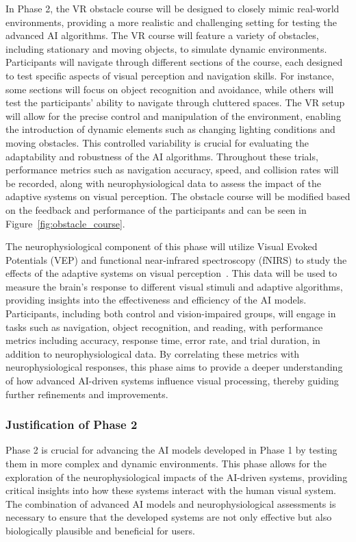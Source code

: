 \documentclass[10pt]{article}
\begin{document}
In Phase 2, the VR obstacle course will be designed to closely mimic real-world
environments, providing a more realistic and challenging setting for testing the
advanced AI algorithms. The VR course will feature a variety of obstacles,
including stationary and moving objects, to simulate dynamic environments.
Participants will navigate through different sections of the course, each
designed to test specific aspects of visual perception and navigation skills.
For instance, some sections will focus on object recognition and avoidance,
while others will test the participants' ability to navigate through cluttered
spaces. The VR setup will allow for the precise control and manipulation of the
environment, enabling the introduction of dynamic elements such as changing
lighting conditions and moving obstacles. This controlled variability is crucial
for evaluating the adaptability and robustness of the AI algorithms. Throughout
these trials, performance metrics such as navigation accuracy, speed, and
collision rates will be recorded, along with neurophysiological data to assess
the impact of the adaptive systems on visual perception. The obstacle course
will be modified based on the feedback and performance of the participants and
can be seen in Figure~\ref{fig:obstacle_course}.

The neurophysiological component of this phase will utilize Visual Evoked
Potentials (VEP) and functional near-infrared spectroscopy (fNIRS) to study the
effects of the adaptive systems on visual
perception~\parencite{martinez-cagigalBrainComputerInterfaces2021,klistornerAnalysisMultifocalVisual2022,chenNeuralCorrelatesObstacle2017}.
This data will be used to measure the brain's response to different visual
stimuli and adaptive algorithms, providing insights into the effectiveness and
efficiency of the AI models. Participants, including both control and
vision-impaired groups, will engage in tasks such as navigation, object
recognition, and reading, with performance metrics including accuracy, response
time, error rate, and trial duration, in addition to neurophysiological data. By
correlating these metrics with neurophysiological responses, this phase aims to
provide a deeper understanding of how advanced AI-driven systems influence
visual processing, thereby guiding further refinements and improvements.

\subsubsection*{Justification of Phase 2}
Phase 2 is crucial for advancing the AI models developed in Phase 1 by testing
them in more complex and dynamic environments. This phase allows for the
exploration of the neurophysiological impacts of the AI-driven systems,
providing critical insights into how these systems interact with the human
visual system. The combination of advanced AI models and neurophysiological
assessments is necessary to ensure that the developed systems are not only
effective but also biologically plausible and beneficial for users.
\end{document}
